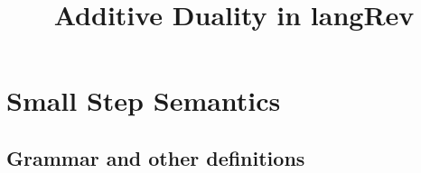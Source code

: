 \documentclass[preprint]{easychair}
\begin{document}
%
\title{Additive Duality in {{langRev}} } 

%


%

\maketitle




\section{Small Step Semantics}
\subsection{Grammar and other definitions}

%
%
%
\end{document}
